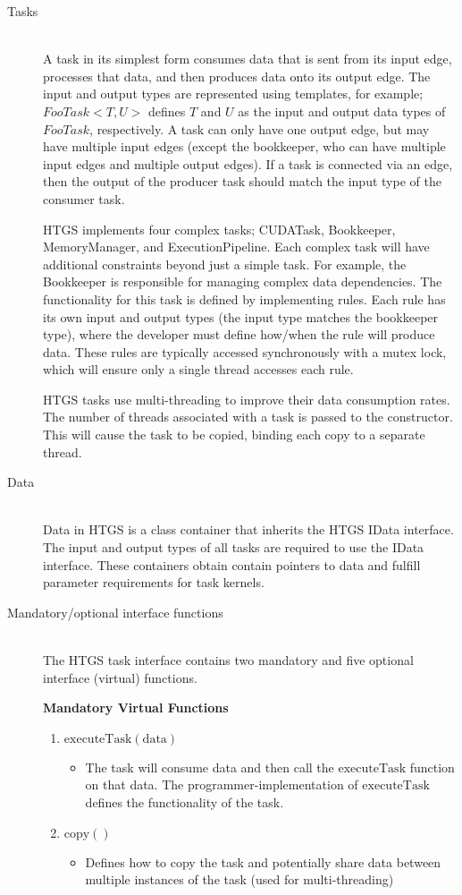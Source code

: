 \documentclass[]{article}
\begin{document}
\begin{description}
\item[Tasks] \hfill \\
	A task in its simplest form consumes data that is sent from its input edge, processes that data, and then produces data onto its output edge. The input and output types are represented using templates, for example; $FooTask<T, U>$ defines $T$ and $U$ as the input and output data types of $FooTask$, respectively. A task can only have one output edge, but may have multiple input edges (except the bookkeeper, who can have multiple input edges and multiple output edges). If a task is connected via an edge, then the output of the producer task should match the input type of the consumer task.
	
	HTGS implements four complex tasks; CUDATask, Bookkeeper, MemoryManager, and ExecutionPipeline. Each complex task will have additional constraints beyond just a simple task.  For example, the Bookkeeper is responsible for managing complex data dependencies. The functionality for this task is defined by implementing rules. Each rule has its own input and output types (the input type matches the bookkeeper type), where the developer must define how/when the rule will produce data. These rules are typically accessed synchronously with a mutex lock, which will ensure only a single thread accesses each rule. 
	
    HTGS tasks use multi-threading to improve their data consumption rates. The number of threads associated with a task is passed to the constructor. This will cause the task to be copied, binding each copy to a separate thread.
	
\item[Data] \hfill \\	
	Data in HTGS is a class container that inherits the HTGS IData interface. The input and output types of all tasks are required to use the IData interface. These containers obtain contain pointers to data and fulfill parameter requirements for task kernels.
	
\item[Mandatory/optional interface functions] \hfill \\
	The HTGS task interface contains two mandatory and five optional interface (virtual) functions.
	
	\textbf{Mandatory Virtual Functions}
	\begin{enumerate}
	\item $\mathrm{executeTask(data)}$
		\begin{itemize}
		\item The task will consume data and then call the $\mathrm{executeTask}$ function on that data. The programmer-implementation of $\mathrm{executeTask}$ defines the functionality of the task.
		\end{itemize}
	\item $\mathrm{copy()}$
		\begin{itemize}
		\item Defines how to copy the task and potentially share data between multiple instances of the task (used for multi-threading)
		\end{itemize}
	\end{enumerate}


\end{description}
\end{document}
